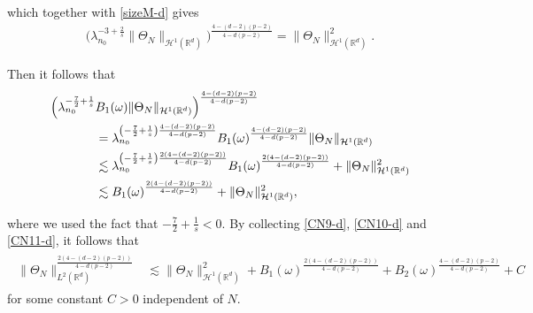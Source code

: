 \documentclass[%
11pt,  reqno]{amsart}
\theoremstyle{remarkstyle}
\newcommand{\1}{\hspace{0.2mm}\text{I}\hspace{0.2mm}}
\newcommand{\noi}{\noindent}
\newcommand{\R}{\mathbb{R}}
\newcommand{\ld}{\lambda}
\renewcommand{\o}{\omega}
\newcommand{\les}{\lesssim}
\numberwithin{equation}{section}
\numberwithin{theorem}{section}
\begin{document}
	\noi 
	which together with \eqref{sizeM-d} gives
	\begin{align}
		\label{CN10-d}
		\Big( \ld_{n_0}^{-3+\frac2s}    \| \Theta_N \|_{\mathcal H^1(\R^d)}\Big)^{\frac{4-(d-2)(p-2)}{4-d(p-2)}} =  \| \Theta_N \|_{\mathcal H^1(\R^d)}^2.
	\end{align}
	
	\noi 
	Then it follows that
	\begin{align}
		\label{CN11-d}
		\begin{split}
			&\Big( \ld_{n_0}^{-\frac72 + \frac1s}  B_1(\o)   \| \Theta_N \|_{\mathcal H^1(\R^d)}\Big)^{\frac{4-(d-2)(p-2)}{4-d(p-2)}} \\ 
			&\hphantom{XXXX} = \ld_{n_0}^{\left(-\frac72 + \frac1s\right)\frac{4-(d-2)(p-2)}{4-d(p-2)}} B_1(\o)^{\frac{4-(d-2)(p-2)}{4-d(p-2)}} \|\Theta_N\|_{\mathcal H^1(\R^d)} \\
			&\hphantom{XXXX} \les \ld_{n_0}^{\left(-\frac72 + \frac1s\right)\frac{2(4-(d-2)(p-2))}{4-d(p-2)}} B_1(\o)^{\frac{2(4-(d-2)(p-2))}{4-d(p-2)}}  + \|\Theta_N\|_{\mathcal H^1(\R^d)}^2\\
			&\hphantom{XXXX} \les B_1(\o)^{\frac{2(4-(d-2)(p-2))}{4-d(p-2)}}  + \|\Theta_N\|_{\mathcal H^1(\R^d)}^2,
		\end{split}
	\end{align}
	
	\noi 
	where we used the fact that $-\frac72 + \frac1s < 0$.
	By collecting \eqref{CN9-d}, \eqref{CN10-d} and \eqref{CN11-d},
	it follows that 
	\begin{align}
		\label{CN12-d}
		\begin{split}
			\| \Theta_N\|_{L^2(\R^d)}^{\frac{2(4-(d-2)(p-2))}{4-d(p-2)}}  & \les \|\Theta_N\|_{\mathcal H^1(\R^d)}^2 + B_1(\o)^{\frac{2(4-(d-2)(p-2))}{4-d(p-2)}} + B_2(\o)^{\frac{4-(d-2)(p-2)}{4-d(p-2)}} + C
		\end{split}
	\end{align}
	for some constant $C>0$ independent of $N$. 
	
\end{document}
